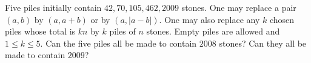 Five piles initially contain $42,70,105,462,2009$ stones. One may replace a pair $(a,b)$ by $(a,a+b)$ or by $(a,|a-b|)$. One may also replace any $k$ chosen piles whose total is $kn$ by $k$ piles of $n$ stones. Empty piles are allowed and $1\le k\le5$. Can the five piles all be made to contain $2008$ stones? Can they all be made to contain $2009$?
